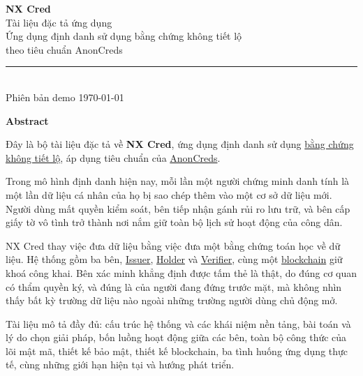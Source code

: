 \documentclass[a4paper,11pt,oneside]{report}
\theoremstyle{definition}
\theoremstyle{plain}
\newcommand{\g}[2]{\hyperref[term:#1]{#2}}
\begin{document}
\begin{titlepage}
\centering
\vspace*{3.2cm}
{\sffamily\Huge\bfseries NX Cred}\\[10pt]
{\sffamily\LARGE Tài liệu đặc tả ứng dụng}\\[26pt]
{\large\color{muted} Ứng dụng định danh sử dụng bằng chứng không tiết lộ\\
theo tiêu chuẩn AnonCreds}\\[46pt]
\rule{0.6\textwidth}{0.4pt}\\[16pt]
{\color{muted} Phiên bản demo \quad\textbullet\quad \today}
\vfill
\end{titlepage}

\thispagestyle{empty}
\vspace*{2cm}
\begin{center}
{\sffamily\LARGE\bfseries Abstract}
\end{center}
\vspace{1.4cm}

\noindent
Đây là bộ tài liệu đặc tả về \textbf{NX Cred}, ứng dụng định danh sử dụng
\g{zkp}{bằng chứng không tiết lộ}, áp dụng tiêu chuẩn của \g{anoncreds}{AnonCreds}.

\bigskip
\noindent
Trong mô hình định danh hiện nay, mỗi lần một người chứng minh danh tính là một lần dữ liệu cá
nhân của họ bị sao chép thêm vào một cơ sở dữ liệu mới. Người dùng mất quyền kiểm soát, bên tiếp
nhận gánh rủi ro lưu trữ, và bên cấp giấy tờ vô tình trở thành nơi nắm giữ toàn bộ lịch sử hoạt
động của công dân.

\bigskip
\noindent
NX Cred thay việc đưa dữ liệu bằng việc đưa một bằng chứng toán học về dữ liệu. Hệ thống gồm ba
bên, \g{issuer}{Issuer}, \g{holder}{Holder} và \g{verifier}{Verifier}, cùng một
\g{blockchain}{blockchain} giữ khoá công khai. Bên xác minh khẳng định được tấm thẻ là thật, do
đúng cơ quan có thẩm quyền ký, và đúng là của người đang đứng trước mặt, mà không nhìn thấy bất
kỳ trường dữ liệu nào ngoài những trường người dùng chủ động mở.

\bigskip
\noindent
Tài liệu mô tả đầy đủ: cấu trúc hệ thống và các khái niệm nền tảng, bài toán và lý do chọn giải
pháp, bốn luồng hoạt động giữa các bên, toàn bộ công thức của lõi mật mã, thiết kế bảo mật,
thiết kế blockchain, ba tình huống ứng dụng thực tế, cùng những giới hạn hiện tại và hướng phát
triển.
\end{document}
